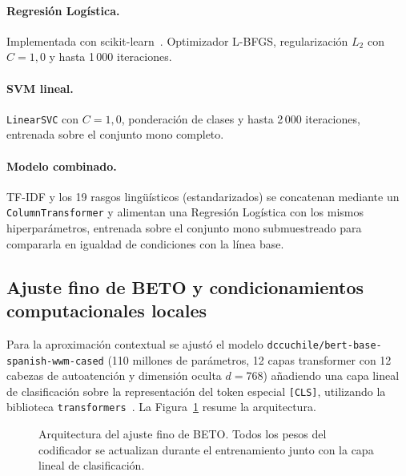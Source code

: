 \documentclass[12pt,a4paper]{article}
\begin{document}
\paragraph{Regresión Logística.} Implementada con scikit-learn~\cite{pedregosa2011scikit}. Optimizador L-BFGS, regularización $L_2$ con $C=1{,}0$ y hasta 1\,000 iteraciones.

\paragraph{SVM lineal.} \texttt{LinearSVC} con $C=1{,}0$, ponderación de clases y hasta 2\,000 iteraciones, entrenada sobre el conjunto mono completo.

\paragraph{Modelo combinado.} TF-IDF y los 19 rasgos lingüísticos (estandarizados) se concatenan mediante un \texttt{ColumnTransformer} y alimentan una Regresión Logística con los mismos hiperparámetros, entrenada sobre el conjunto mono submuestreado para compararla en igualdad de condiciones con la línea base.

\subsection{Ajuste fino de BETO y condicionamientos computacionales locales}
\label{sec:beto_hardware}
Para la aproximación contextual se ajustó el modelo \texttt{dccuchile/}\allowbreak\texttt{bert-base-}\allowbreak\texttt{spanish-}\allowbreak\texttt{wwm-cased} (110 millones de parámetros, 12 capas transformer con 12 cabezas de autoatención y dimensión oculta $d=768$) añadiendo una capa lineal de clasificación sobre la representación del token especial \texttt{[CLS]}, utilizando la biblioteca \texttt{transformers}~\cite{wolf2020transformers}. La Figura~\ref{fig:beto} resume la arquitectura.

\begin{figure}[H]
\centering
\resizebox{\textwidth}{!}{}
\caption{Arquitectura del ajuste fino de BETO. Todos los pesos del codificador se actualizan durante el entrenamiento junto con la capa lineal de clasificación.}
\label{fig:beto}
\end{figure}
\end{document}
